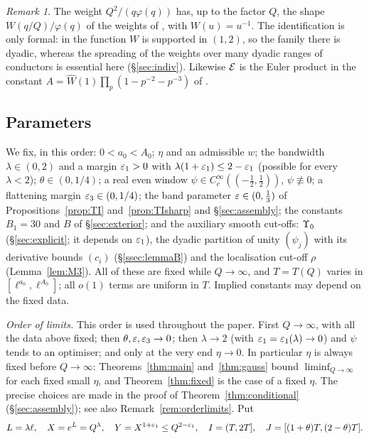 \documentclass[11pt]{amsart}
\theoremstyle{definition}
\theoremstyle{remark}
\newtheorem{remark}[theorem]{Remark}
\numberwithin{equation}{section}
\begin{document}
\begin{remark}
The weight $Q^2/(q\varphi(q))$ has, up to the factor $Q$, the shape $W(q/Q)/\varphi(q)$ of the weights of \cite{CLLR,Sono16}, with $W(u)=u^{-1}$. The identification is only formal: in \cite{CLLR} the function $W$ is supported in $(1,2)$, so the family there is dyadic, whereas the spreading of the weights over many dyadic ranges of conductors is essential here (\S\ref{sec:indiv}). Likewise $\mathcal E$ is the Euler product in the constant $A=\widehat W(1)\prod_p(1-p^{-2}-p^{-3})$ of \cite[(1.1)]{CLLR}.
\end{remark}

\subsection{Parameters}\label{sec:parameters}
We fix, in this order: $0<a_0<A_0$; $\eta$ and an admissible $w$; the bandwidth $\lambda\in(0,2)$ and a margin $\varepsilon_1>0$ with $\lambda(1+\varepsilon_1)\le2-\varepsilon_1$ (possible for every $\lambda<2$); $\theta\in(0,1/4)$; a real even window $\psi\in C_c^\infty((-\frac12,\frac12))$, $\psi\not\equiv0$; a flattening margin $\varepsilon_3\in(0,1/4)$; the band parameter $\varepsilon\in(0,\frac13)$ of Propositions~\ref{prop:TI} and~\ref{prop:TIsharp} and \S\ref{sec:assembly}; the constants $B_1=30$ and $B$ of \S\ref{sec:exterior}; and the auxiliary smooth cut-offs: $\Upsilon_0$ (\S\ref{sec:explicit}; it depends on $\varepsilon_1$), the dyadic partition of unity $(\psi_j)$ with its derivative bounds $(c_i)$ (\S\ref{ssec:lemmaB}) and the localisation cut-off $\rho$ (Lemma~\ref{lem:M3}). All of these are fixed while $Q\to\infty$, and $T=T(Q)$ varies in $[\ell^{a_0},\ell^{A_0}]$; all $o(1)$ terms are uniform in $T$. Implied constants may depend on the fixed data.

\emph{Order of limits.} This order is used throughout the paper. First $Q\to\infty$, with all the data above fixed; then $\theta,\varepsilon,\varepsilon_3\to0$; then $\lambda\to2$ (with $\varepsilon_1=\varepsilon_1(\lambda)\to0$) and $\psi$ tends to an optimiser; and only at the very end $\eta\to0$. In particular $\eta$ is always fixed before $Q\to\infty$: Theorems~\ref{thm:main} and~\ref{thm:gauss} bound $\liminf_{Q\to\infty}$ for each fixed small $\eta$, and Theorem~\ref{thm:fixed} is the case of a fixed $\eta$. The precise choices are made in the proof of Theorem~\ref{thm:conditional} (\S\ref{sec:assembly}); see also Remark~\ref{rem:orderlimits}. Put
\[
L=\lambda\ell,\quad X=e^L=Q^\lambda,\quad Y=X^{1+\varepsilon_1}\le Q^{2-\varepsilon_1},\quad I=(T,2T],\quad J=[(1+\theta)T,(2-\theta)T].
\]
\end{document}
